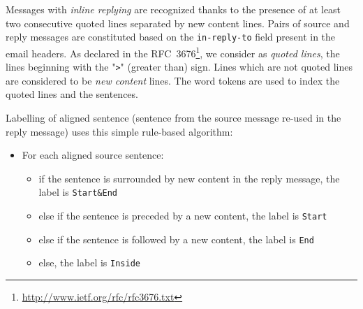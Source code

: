 %
Messages with \textit{inline replying} are recognized thanks to the presence of at least two consecutive quoted lines separated by new content lines. 
Pairs of source and reply messages are constituted based on the \texttt{\footnotesize in-reply-to} field present in the email headers.
 As declared in the RFC~3676\footnote{\url{http://www.ietf.org/rfc/rfc3676.txt}}, we consider as \textit{quoted lines}, the lines %
 beginning with %
 the "\texttt{>}" (greater than) sign.
Lines which are not quoted lines are considered to be \textit{new content} lines.
The word tokens are used to index the quoted lines and the sentences. 


Labelling of aligned sentence (sentence from the source message re-used in the reply message) uses this simple rule-based algorithm:

\begin{itemize}
\item[] For each aligned source sentence: \vspace{-0.2cm}
\begin{itemize}
\item[] if the sentence is surrounded by new content in the reply message, the label is \texttt{\footnotesize Start\&End}
\item[] else if the sentence is preceded by a new content, the label is \texttt{\footnotesize Start}
\item[] \indent else if the sentence is followed by a new content, the label is \texttt{\footnotesize End}
\item[] else, the label is \texttt{\footnotesize Inside}
\end{itemize}
\end{itemize}

